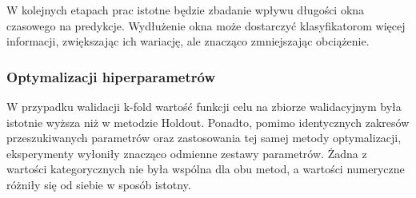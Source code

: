 \documentclass[a4paper,twoside,12pt]{book}
\begin{document}
W kolejnych etapach prac istotne będzie zbadanie wpływu długości okna czasowego na predykcje. Wydłużenie okna może dostarczyć klasyfikatorom więcej informacji, zwiększając ich wariację, ale znacząco zmniejszając obciążenie.


\subsubsection{Optymalizacji hiperparametrów}
W przypadku walidacji k-fold wartość funkcji celu na zbiorze walidacyjnym była istotnie wyższa niż w metodzie Holdout. Ponadto, pomimo identycznych zakresów przeszukiwanych parametrów oraz zastosowania tej samej metody optymalizacji, eksperymenty wyłoniły znacząco odmienne zestawy parametrów. Żadna z wartości kategorycznych nie była wspólna dla obu metod, a wartości numeryczne różniły się od siebie w sposób istotny.\newline

\begin{table}[!h]
	\centering
	\caption{Zmiany wartości miar jakościowych po optymlizacji dla walidacji Holdout}
	\label{k-fold_cechowa_opty}
\end{table}
\end{document}
